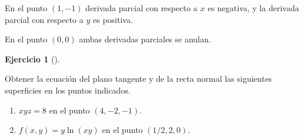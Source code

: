 \documentclass[
  spanish,
  a4paper,
]{scrreport}
\theoremstyle{definition}
\newtheorem{exercise}{Ejercicio}[chapter]
\theoremstyle{remark}
\begin{document}
\begin{tcolorbox}[enhanced jigsaw, arc=.35mm, bottomrule=.15mm, bottomtitle=1mm, breakable, colback=white, colbacktitle=quarto-callout-tip-color!10!white, colframe=quarto-callout-tip-color-frame, coltitle=black, left=2mm, leftrule=.75mm, opacityback=0, opacitybacktitle=0.6, rightrule=.15mm, title=\textcolor{quarto-callout-tip-color}{\faLightbulb}\hspace{0.5em}{Solución}, titlerule=0mm, toprule=.15mm, toptitle=1mm]

En el punto \((1,-1)\) derivada parcial con respecto a \(x\) es
negativa, y la derivada parcial con respecto a \(y\) es positiva.

En el punto \((0,0)\) ambas derivadas parciales se anulan.

\end{tcolorbox}

\begin{exercise}[]\protect\hypertarget{exr-recta-normal-plano-tangente-superficie}{}\label{exr-recta-normal-plano-tangente-superficie}

Obtener la ecuación del plano tangente y de la recta normal las
siguientes superficies en los puntos indicados.

\begin{enumerate}
\def\labelenumi{\alph{enumi}.}
\item
  \(xyz=8\) en el punto \((4,-2,-1)\).
\item
  \(f(x,y) = y\ln(xy)\) en el punto \((1/2, 2, 0)\).
\end{enumerate}

\end{exercise}
\end{document}
